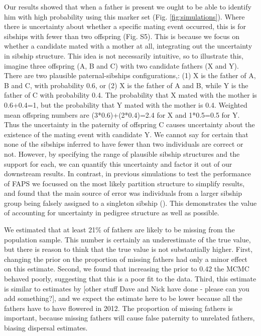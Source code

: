 \documentclass[10pt, a4paper, twocolumn]{article} %
\begin{document}
Our results showed that when a father is present we ought to be able to identify him with high probability using this marker set (Fig. \ref{fig:simulations}).
Where there is uncertainty about whether a specific mating event occurred, this is for sibships with fewer than two offspring (Fig. S5).
This is because we focus on whether a candidate mated with a mother at all, integrating out the uncertainty in sibship structure.
This idea is not necessarily intuitive, so to illustrate this, imagine three offspring (A, B and C) with two candidate fathers (X and Y).
There are two plausible paternal-sibships configurations,: (1) X is the father of A, B and C, with probability 0.6, or (2) X is the father of A and B, while Y is the father of C with probability 0.4.
The probability that X mated with the mother is 0.6+0.4=1, but the probability that Y mated with the mother is 0.4.
Weighted mean offspring numbers are (3*0.6)+(2*0.4)=2.4 for X and 1*0.5=0.5 for Y.
Thus the uncertainty in the paternity of offspring C causes uncertainty about the existence of the mating event with candidate Y.
We cannot say for certain that none of the sibships inferred to have fewer than two individuals are correct or not. 
However, by specifying the range of plausible sibship structures and the support for each, we can quantify this uncertainty and factor it out of our downstream results.
In contrast, in previous simulations to test the performance of FAPS we focussed on the most likely partition structure to simplify results, and found that the main source of error was individuals from a larger sibship group being falsely assigned to a singleton sibship (\cite{ellis2018efficient}).
This demonstrates the value of accounting for uncertainty in pedigree structure as well as possible.

We estimated that at least 21\% of fathers are likely to be missing from the population sample.
This number is certainly an underestimate of the true value, but there is reason to think that the true value is not substantially higher.
First, changing the prior on the proportion of missing fathers had only a minor effect on this estimate.
Second, we found that increasing the prior to 0.42 the MCMC behaved poorly, suggesting that this is a poor fit to the data.
Third, this estimate is similar to estimates by [other stuff Dave and Nick have done - please can you add something?], and we expect the estimate here to be lower because all the fathers have to have flowered in 2012.
The proportion of missing fathers is important, because missing fathers will cause false paternity to unrelated fathers, biasing dispersal estimates.
\end{document}
